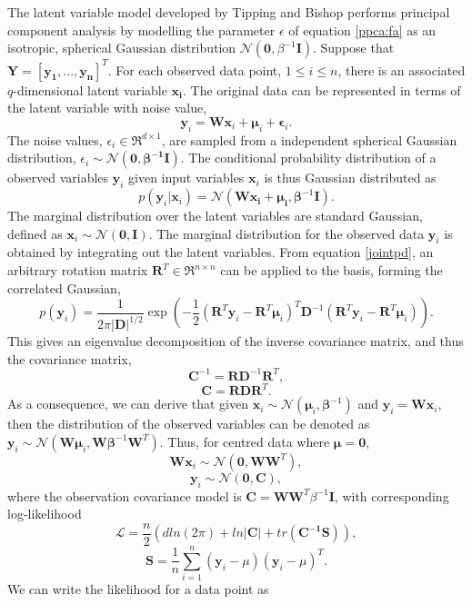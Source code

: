 \documentclass[ %
author={Dillon Keith Diep},
supervisor={Dr. Carl Henrik Ek},
degree={MEng},
title={ART-CG:},
subtitle={Assisted Real-time Content Generation of 3D Hair by Learning Manifolds},
type={Research},
year={2017} ]{dissertation}
\begin{document}
The latent variable model developed by Tipping and Bishop performs principal component analysis by modelling the parameter $\epsilon$ of equation \ref{ppca:fa} as an isotropic, spherical Gaussian distribution $\mathcal{N}(\bm{0},\beta^{-1}\bm{I})$. Suppose that $\bm{Y=[y_1,...,y_n]}^T$.
For each observed data point, $1 \leq i \leq n $, there is an associated $q$-dimensional latent variable $\bm{x_i}$.
The original data can be represented in terms of the latent variable with noise value,
$$\bm{y}_i=\bm{Wx}_i+\bm{\mu}_i+\bm{\epsilon}_i.$$
The noise values, $\epsilon_i \in \Re^{d \times 1}$, are sampled from a independent spherical Gaussian distribution, $\epsilon_i\sim\mathcal{N}(\bm{0, \beta^{-1}I})$.
The conditional probability distribution of a observed variables $\bm{y}_i$ given input variables $\bm{x}_i$ is thus Gaussian distributed as
\begin{equation} \label{ppca:conditional}
p(\bm{y}_i|\bm{x}_i)=\mathcal{N}(\bm{W\bm{x}_i+\bm{\mu}_i},\bm{\beta}^{-1}\bm{I}). 
\end{equation}
The marginal distribution over the latent variables are standard Gaussian, defined as $\bm{x}_i\sim\mathcal{N}(\bm{0},\bm{I})$. The marginal distribution for the observed data $\bm{y}_i$ is obtained by integrating out the latent variables.
From equation \ref{jointpd}, an arbitrary rotation matrix $\bm{R}^T\in\Re^{n \times n}$ can be applied to the basis, forming the correlated Gaussian,
$$p(\bm{y}_i)=\frac{1}{2\pi|\bm{D}|^{1/2}}\exp\left(-\frac{1}{2}(\bm{R}^T\bm{y}_i-\bm{R}^T\bm{\mu}_i)^T\bm{D}^{-1}(\bm{R}^T\bm{y}_i-\bm{R}^T\bm{\mu}_i)\right).$$
This gives an eigenvalue decomposition of the inverse covariance matrix, and thus the covariance matrix,
$$\bm{C}^{-1}=\bm{RD}^{-1}\bm{R}^T,$$
$$\bm{C}=\bm{RDR}^T.$$
As a consequence, we can derive that given $\bm{x}_i\sim\mathcal{N}(\bm{\mu}_i,\bm{\beta}^{-1})$ and $\bm{y}_i=\bm{Wx}_i$, then the distribution of the observed variables can be denoted as $\bm{y}_i\sim\mathcal{N}(\bm{W\mu}_i,\bm{W\beta}^{-1}\bm{W}^T)$.
Thus, for centred data where $\bm{\mu}=\bm{0}$, 
$$\bm{Wx}_i\sim\mathcal{N}(\bm{0},\bm{WW}^T),$$
$$\bm{y}_i\sim\mathcal{N}(\bm{0},\bm{C}),$$
where the observation covariance model is $\bm{C}=\bm{WW}^T\beta^{-1}\bm{I}$, with corresponding log-likelihood \cite{gplvm}
\begin{equation} \label{ppca:loglikelihood}
\mathcal{L}=\frac{n}{2}(d ln(2\pi)+ln|\bm{C}|+tr(\bm{C^{-1}S})),
\end{equation}
$$\bm{S}=\frac{1}{n}\sum^n_{i=1}(\bm{y}_i-\mu)(\bm{y}_i-\mu)^T.$$
We can write the likelihood for a data point as
\end{document}
